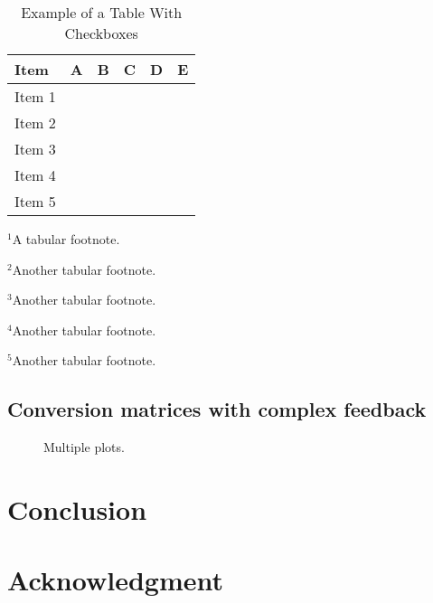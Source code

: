 \documentclass[conference]{IEEEtran}
\begin{document}
\begin{table}[!t]
\begin{threeparttable}
\renewcommand{\arraystretch}{1.25}
\setlength\tabcolsep{0.24em}
\caption{Example of a Table With Checkboxes}
\label{table_example}
\centering
\begin{tabular}{l|ccccc}
\vspace{-0.3em}
Item & A & B & C & D & E \tabularnewline
\hline
Item 1 \cite{Andrews2012} & \y[1] & \y & \y[2] & \n & \n \tabularnewline
Item 2 \cite{Hameed2018,Hameed2015,Hammler2014} & \n & \y & \y[2] & \y & \n \tabularnewline
Item 3 \cite{Kwon2018} & \y[3] & \n & \n & \y & \n \tabularnewline
Item 4 \cite{Muratore2019} & \y[4] & \y & \y[5] & \y & \y \tabularnewline
Item 5 \cite{Klumperink2017} & \y & \y & \n & \y & \y \tabularnewline
\end{tabular}
\begin{tablenotes}
\scriptsize
  \item $^1$A tabular footnote.
  \item $^2$Another tabular footnote.
  \item $^3$Another tabular footnote.
  \item $^4$Another tabular footnote.
  \item $^5$Another tabular footnote.
\end{tablenotes}
\end{threeparttable}
\end{table}


\subsection{Conversion matrices with complex feedback}
\lipsum[10-12]

\begin{figure}[!t]
\centering

\caption{Multiple plots.}
\label{fig_multi}
\vspace{-0.4em}
\end{figure}


\section{Conclusion}
\label{section_concl}

\lorem[1]




\section*{Acknowledgment}
\lorem[13][1]






\end{document}
